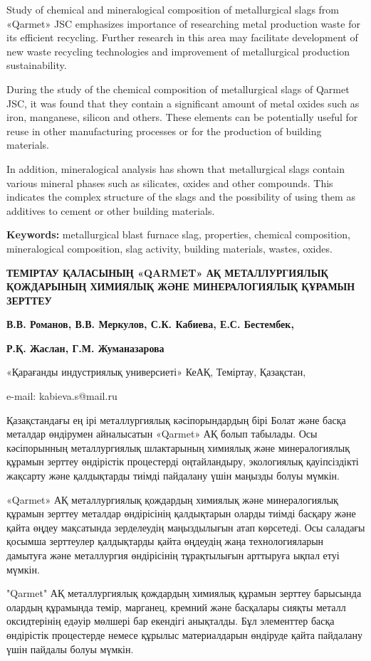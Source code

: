 Study of chemical and mineralogical composition of metallurgical slags
from «Qarmet» JSC emphasizes importance of researching metal production
waste for its efficient recycling. Further research in this area may
facilitate development of new waste recycling technologies and
improvement of metallurgical production sustainability.

During the study of the chemical composition of metallurgical slags of
Qarmet JSC, it was found that they contain a significant amount of metal
oxides such as iron, manganese, silicon and others. These elements can
be potentially useful for reuse in other manufacturing processes or for
the production of building materials.

In addition, mineralogical analysis has shown that metallurgical slags
contain various mineral phases such as silicates, oxides and other
compounds. This indicates the complex structure of the slags and the
possibility of using them as additives to cement or other building
materials.

\textbf{Keywords:} metallurgical blast furnace slag, properties,
chemical composition, mineralogical composition, slag activity, building
materials, wastes, oxides.

\textbf{ТЕМІРТАУ ҚАЛАСЫНЫҢ «QARMET» АҚ МЕТАЛЛУРГИЯЛЫҚ ҚОЖДАРЫНЫҢ
ХИМИЯЛЫҚ ЖӘНЕ МИНЕРАЛОГИЯЛЫҚ ҚҰРАМЫН ЗЕРТТЕУ}

\textbf{В.В. Романов, В.В. Меркулов, С.К. Кабиева, Е.С. Бестембек,}

\textbf{Р.Қ. Жаслан, Г.М. Жуманазарова}

«Қарағанды индустриялық универсиеті» КеАҚ, Теміртау, Қазақстан,

e-mail: kabieva.s@mail.ru

Қазақстандағы ең ірі металлургиялық кәсіпорындардың бірі Болат және
басқа металдар өндірумен айналысатын «Qarmet» АҚ болып табылады. Осы
кәсіпорынның металлургиялық шлактарының химиялық және минералогиялық
құрамын зерттеу өндірістік процестерді оңтайландыру, экологиялық
қауіпсіздікті жақсарту және қалдықтарды тиімді пайдалану үшін маңызды
болуы мүмкін.

«Qarmet» АҚ металлургиялық қождардың химиялық және минералогиялық
құрамын зерттеу металдар өндірісінің қалдықтарын оларды тиімді басқару
және қайта өңдеу мақсатында зерделеудің маңыздылығын атап көрсетеді. Осы
саладағы қосымша зерттеулер қалдықтарды қайта өңдеудің жаңа
технологияларын дамытуға және металлургия өндірісінің тұрақтылығын
арттыруға ықпал етуі мүмкін.

"Qarmet" АҚ металлургиялық қождардың химиялық құрамын зерттеу барысында
олардың құрамында темір, марганец, кремний және басқалары сияқты металл
оксидтерінің едәуір мөлшері бар екендігі анықталды. Бұл элементтер басқа
өндірістік процестерде немесе құрылыс материалдарын өндіруде қайта
пайдалану үшін пайдалы болуы мүмкін.

